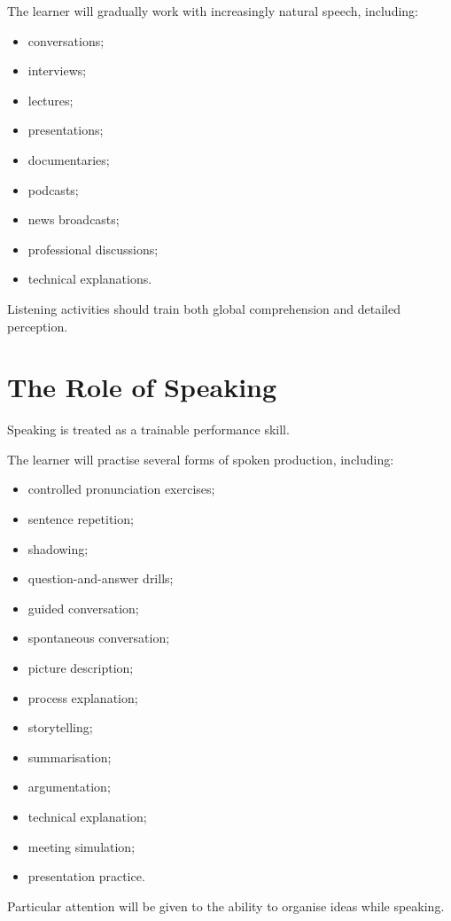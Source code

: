 The learner will gradually work with increasingly natural speech, including:

\begin{itemize}
    \item conversations;
    \item interviews;
    \item lectures;
    \item presentations;
    \item documentaries;
    \item podcasts;
    \item news broadcasts;
    \item professional discussions;
    \item technical explanations.
\end{itemize}

Listening activities should train both global comprehension and detailed perception.

\section*{The Role of Speaking}

Speaking is treated as a trainable performance skill.

The learner will practise several forms of spoken production, including:

\begin{itemize}
    \item controlled pronunciation exercises;
    \item sentence repetition;
    \item shadowing;
    \item question-and-answer drills;
    \item guided conversation;
    \item spontaneous conversation;
    \item picture description;
    \item process explanation;
    \item storytelling;
    \item summarisation;
    \item argumentation;
    \item technical explanation;
    \item meeting simulation;
    \item presentation practice.
\end{itemize}

Particular attention will be given to the ability to organise ideas while speaking.

